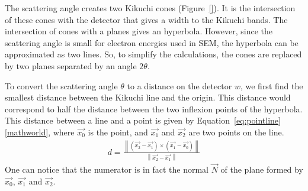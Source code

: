 \documentclass[letterpaper]{article}
\newcommand{\norm}[1]{\left\|#1\right\|}
\begin{document}
	
	The scattering angle creates two Kikuchi cones (Figure~\ref{}). 
	It is the intersection of these cones with the detector that gives a width to the Kikuchi bands.
	The intersection of cones with a planes gives an hyperbola. 
	However, since the scattering angle is small for electron energies used in SEM, the hyperbola can be approximated as two lines. 
	So, to simplify the calculations, the cones are replaced by two planes separated by an angle $2\theta$.
	
	
	To convert the scattering angle $\theta$  to a distance on the detector $w$, we first find the smallest distance between the Kikuchi line and the origin. 
	This distance would correspond to half the distance between the two inflexion points of the hyperbola.
	This distance between a line and a point is given by Equation~\ref{eq:pointline}\ref{mathworld}, where $\vec{x_0}$ is the point, and $\vec{x_1}$ and $\vec{x_2}$ are two points on the line.
	\begin{eqnarray}
		d = \frac{\norm{(\vec{x_2}-\vec{x_1}) \times (\vec{x_1}-\vec{x_0})}}{\norm{\vec{x_2}-\vec{x_1}}}
		\label{eq:pointline}
	\end{eqnarray}
	One can notice that the numerator is in fact the normal $\vec{N}$ of the plane formed by $\vec{x_0}$, $\vec{x_1}$ and $\vec{x_2}$.
	
	
	
	
\end{document}
